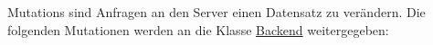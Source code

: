 Mutations sind Anfragen an den Server einen Datensatz zu verändern.
Die folgenden Mutationen werden an die Klasse \hyperref[AP_Backend]{Backend} weitergegeben:
